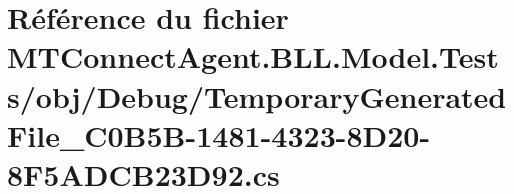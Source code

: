\hypertarget{_m_t_connect_agent_8_b_l_l_8_model_8_tests_2obj_2_debug_2_temporary_generated_file__036_c0_b5_b-07a7d6c42d8fe647cda07d636537e477}{}\section{Référence du fichier M\+T\+Connect\+Agent.\+B\+L\+L.\+Model.\+Tests/obj/\+Debug/\+Temporary\+Generated\+File\+\_\+C0\+B5\+B-\/1481-\/4323-\/8\+D20-\/8\+F5\+A\+D\+C\+B23\+D92.cs}
\label{_m_t_connect_agent_8_b_l_l_8_model_8_tests_2obj_2_debug_2_temporary_generated_file__036_c0_b5_b-07a7d6c42d8fe647cda07d636537e477}
